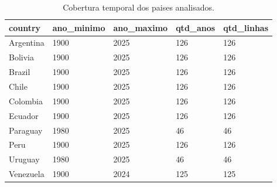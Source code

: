 \begin{table}[htbp]
\centering
\caption{Cobertura temporal dos paises analisados.}
\label{tab:cobertura-paises}
\begin{tabular}{lllll}
\hline
country & ano\_minimo & ano\_maximo & qtd\_anos & qtd\_linhas \\
\hline
Argentina & 1900 & 2025 & 126 & 126 \\
Bolivia & 1900 & 2025 & 126 & 126 \\
Brazil & 1900 & 2025 & 126 & 126 \\
Chile & 1900 & 2025 & 126 & 126 \\
Colombia & 1900 & 2025 & 126 & 126 \\
Ecuador & 1900 & 2025 & 126 & 126 \\
Paraguay & 1980 & 2025 & 46 & 46 \\
Peru & 1900 & 2025 & 126 & 126 \\
Uruguay & 1980 & 2025 & 46 & 46 \\
Venezuela & 1900 & 2024 & 125 & 125 \\
\hline
\end{tabular}
\end{table}
